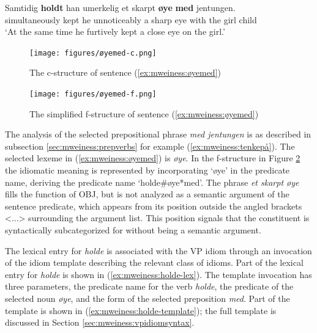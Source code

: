 \documentclass[output=paper]{langsci/langscibook}
\begin{document}
\ea\label{ex:mweiness:øyemed}
\gll Samtidig \textbf{holdt} han umerkelig et skarpt \textbf{øye} \textbf{med} jentungen. \\
     simultaneously kept he unnoticeably a sharp eye with {the girl child}\\
\glt `At the same time he furtively kept a close eye on the girl.'
\z


\begin{figure}
  \texttt{[image: figures/øyemed-c.png]}
  \caption{The c-structure of sentence (\ref{ex:mweiness:øyemed}) }
  \label{fig:mweiness:øyemed-c}
\end{figure}

\begin{figure}
  \texttt{[image: figures/øyemed-f.png]}
  \caption{The simplified f-structure of sentence (\ref{ex:mweiness:øyemed}) }
  \label{fig:mweiness:øyemed-f}
\end{figure}

The analysis of the selected prepositional phrase \textit{med jentungen} is as described in subsection \ref{sec:mweiness:prepverbs} for example (\ref{ex:mweiness:tenkepå}).
The selected lexeme in (\ref{ex:mweiness:øyemed}) is \textit{øye}.
In the f-structure in Figure \ref{fig:mweiness:øyemed-f} the idiomatic meaning is represented by incorporating `øye' in the predicate name, deriving the predicate name `holde\#øye*med'. %
The phrase \textit{et skarpt øye} fills the function of OBJ, but is not analyzed as a semantic argument of the sentence predicate, which appears from its position outside the angled brackets <...> surrounding the argument list.
This position signals that the constituent is syntactically subcategorized for without being a semantic argument.

The lexical entry for \textit{holde} is associated with the VP idiom through an invocation of the idiom template describing the relevant class of idioms.
Part of the lexical entry for \textit{holde} is shown in  (\ref{ex:mweiness:holde-lex}).
The template invocation has three parameters, the predicate name for the verb \textit{holde}, the predicate of the selected noun \textit{øye},  and the form of the selected preposition \textit{med}.
Part of the template is shown in  (\ref{ex:mweiness:holde-template}); the full template is discussed in Section \ref{sec:mweiness:vpidiomsyntax}.
\end{document}
